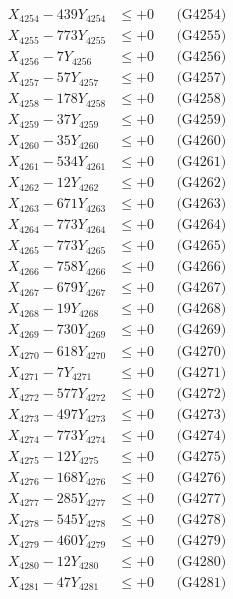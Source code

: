 \documentclass[a4paper,10pt]{article}
\begin{document}
{\begin{align}
X_{4254} - 439Y_{4254} &\leq +0 && \text{(G4254)} \\
X_{4255} - 773Y_{4255} &\leq +0 && \text{(G4255)} \\
X_{4256} - 7Y_{4256} &\leq +0 && \text{(G4256)} \\
X_{4257} - 57Y_{4257} &\leq +0 && \text{(G4257)} \\
X_{4258} - 178Y_{4258} &\leq +0 && \text{(G4258)} \\
X_{4259} - 37Y_{4259} &\leq +0 && \text{(G4259)} \\
X_{4260} - 35Y_{4260} &\leq +0 && \text{(G4260)} \\
\allowbreak
X_{4261} - 534Y_{4261} &\leq +0 && \text{(G4261)} \\
X_{4262} - 12Y_{4262} &\leq +0 && \text{(G4262)} \\
X_{4263} - 671Y_{4263} &\leq +0 && \text{(G4263)} \\
X_{4264} - 773Y_{4264} &\leq +0 && \text{(G4264)} \\
X_{4265} - 773Y_{4265} &\leq +0 && \text{(G4265)} \\
X_{4266} - 758Y_{4266} &\leq +0 && \text{(G4266)} \\
X_{4267} - 679Y_{4267} &\leq +0 && \text{(G4267)} \\
X_{4268} - 19Y_{4268} &\leq +0 && \text{(G4268)} \\
X_{4269} - 730Y_{4269} &\leq +0 && \text{(G4269)} \\
X_{4270} - 618Y_{4270} &\leq +0 && \text{(G4270)} \\
\allowbreak
X_{4271} - 7Y_{4271} &\leq +0 && \text{(G4271)} \\
X_{4272} - 577Y_{4272} &\leq +0 && \text{(G4272)} \\
X_{4273} - 497Y_{4273} &\leq +0 && \text{(G4273)} \\
X_{4274} - 773Y_{4274} &\leq +0 && \text{(G4274)} \\
X_{4275} - 12Y_{4275} &\leq +0 && \text{(G4275)} \\
X_{4276} - 168Y_{4276} &\leq +0 && \text{(G4276)} \\
X_{4277} - 285Y_{4277} &\leq +0 && \text{(G4277)} \\
X_{4278} - 545Y_{4278} &\leq +0 && \text{(G4278)} \\
X_{4279} - 460Y_{4279} &\leq +0 && \text{(G4279)} \\
X_{4280} - 12Y_{4280} &\leq +0 && \text{(G4280)} \\
\allowbreak
X_{4281} - 47Y_{4281} &\leq +0 && \text{(G4281)} \\

\end{align}}
\end{document}
